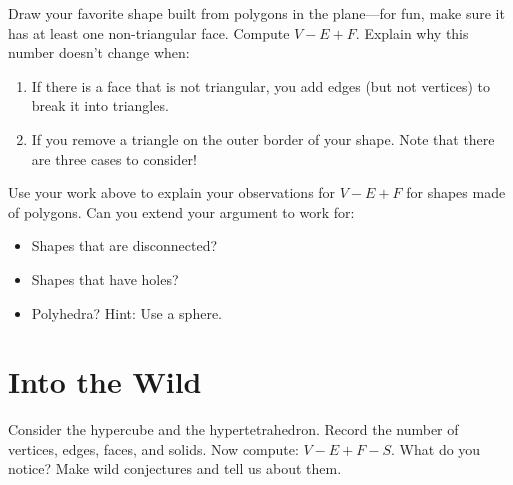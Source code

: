 \documentclass{ximera}
\begin{document}
\begin{question}
Draw your favorite shape built from polygons in the plane---for fun,
make sure it has at least one non-triangular face. Compute
$V-E+F$. Explain why this number doesn't change when:
\begin{enumerate}
\item If there is a face that is not triangular, you add edges (but not vertices) to break it into triangles. 
\item If you remove a triangle on the outer border of your shape. Note that there are three cases to consider!
\end{enumerate}
\end{question}

\begin{question}
Use your work above to explain your observations for $V-E+F$ for
shapes made of polygons. Can you extend your argument to work for: 
\begin{itemize}
\item Shapes that are disconnected? 
\item Shapes that have holes?
\item Polyhedra? Hint: Use a sphere.
\end{itemize} 
\end{question}



\section*{Into the Wild}

\begin{question}
Consider the hypercube and the hypertetrahedron. Record the number of
vertices, edges, faces, and solids. Now compute: $V-E+F-S$. What do
you notice? Make wild conjectures and tell us about them.
\end{question}
\end{document}
